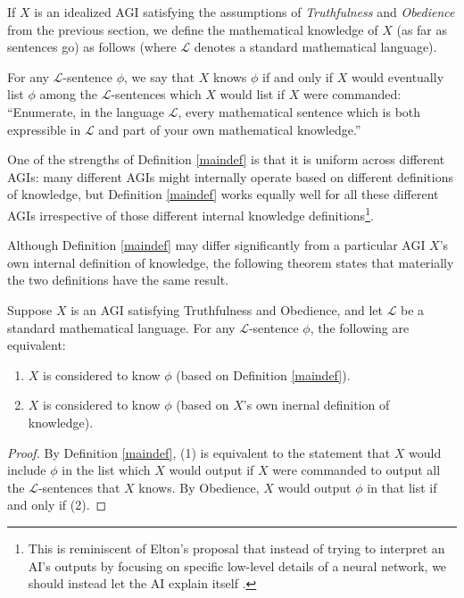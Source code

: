 \documentclass[runningheads]{llncs}
\begin{document}
If $X$ is an idealized AGI satisfying the assumptions of \emph{Truthfulness}
and \emph{Obedience} from the previous section, we define the mathematical
knowledge of $X$ (as far as sentences go)
as follows (where $\mathscr L$ denotes a standard mathematical
language).

\begin{definition}
\label{maindef}
  For any $\mathscr L$-sentence $\phi$, we say that $X$ knows $\phi$ if and only
  if $X$ would eventually list $\phi$ among the $\mathscr L$-sentences which $X$
  would list if $X$ were commanded:
  ``Enumerate, in the language $\mathscr L$, every mathematical sentence which
  is both expressible in $\mathscr L$ and part of your own mathematical knowledge.''
\end{definition}

One of the strengths of Definition \ref{maindef} is that it is uniform across
different AGIs: many different AGIs might internally operate based on different
definitions of knowledge, but Definition \ref{maindef} works equally well for
all these different AGIs irrespective of those different internal knowledge
definitions\footnote{This is reminiscent of Elton's proposal that instead of
trying to interpret an AI's outputs by focusing on specific low-level details
of a neural network, we should instead let the AI explain itself \cite{elton}.}.

Although Definition \ref{maindef} may differ significantly from a particular AGI
$X$'s own internal definition of knowledge, the following theorem states that
materially the two definitions have the same result.

\begin{theorem}
\label{sentenceequivalence}
  Suppose $X$ is an AGI satisfying Truthfulness and Obedience, and let $\mathscr L$
  be a standard mathematical language. For any $\mathscr L$-sentence $\phi$, the following
  are equivalent:
  \begin{enumerate}
    \item $X$ is
    considered to know $\phi$ (based on Definition \ref{maindef}).
    \item
    $X$ is considered to know $\phi$ (based on $X$'s own inernal definition of
    knowledge).
  \end{enumerate}
\end{theorem}

\begin{proof}
  By Definition \ref{maindef}, (1) is equivalent to the statement that $X$ would
  include $\phi$ in the list which $X$ would output if $X$ were commanded to output
  all the $\mathscr L$-sentences that $X$ knows. By Obedience, $X$ would output
  $\phi$ in that list if and only if (2).
\end{proof}
\end{document}

